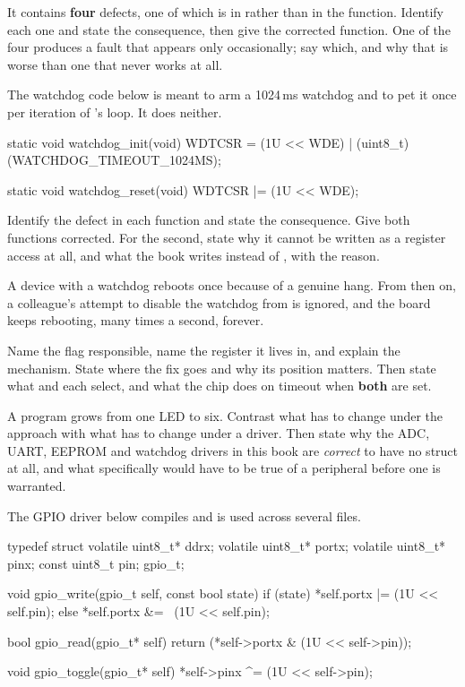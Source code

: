 \noindent It contains \textbf{four} defects, one of which is in  rather than in the
function. Identify each one and state the consequence, then give the corrected function. One of the
four produces a fault that appears only occasionally; say which, and why that is worse than one
that never works at all. 

 The watchdog code below is meant to arm a 1024\,ms watchdog and to pet it once per
iteration of 's loop. It does neither.

\begin{ccode}
static void watchdog_init(void)
{
    WDTCSR = (1U << WDE) | (uint8_t)(WATCHDOG_TIMEOUT_1024MS);
}

static void watchdog_reset(void)
{
    WDTCSR |= (1U << WDE);
}
\end{ccode}

\noindent Identify the defect in each function and state the consequence. Give both functions
corrected. For the second, state why it cannot be written as a register access at all, and what
the book writes instead of , with the reason. 

 A device with a watchdog reboots once because of a genuine hang. From then on, a
colleague's attempt to disable the watchdog from  is ignored, and the board keeps
rebooting, many times a second, forever.

Name the flag responsible, name the register it lives in, and explain the mechanism. State where
the fix goes and why its position matters. Then state what  and  each select,
and what the chip does on timeout when \textbf{both} are set. 

\label{exa:q:7}

 A program grows from one LED to six. Contrast what has to change under the
 approach with what has to change under a
 driver. Then state why the ADC, UART, EEPROM and watchdog drivers in this book are
\emph{correct} to have no struct at all, and what specifically would have to be true of a
peripheral before one is warranted. 

 The GPIO driver below compiles and is used across several files.

\begin{ccode}
typedef struct
{
    volatile uint8_t* ddrx;
    volatile uint8_t* portx;
    volatile uint8_t* pinx;
    const uint8_t pin;
} gpio_t;

void gpio_write(gpio_t self, const bool state)
{
    if (state) { *self.portx |= (1U << self.pin); }
    else { *self.portx &= ~(1U << self.pin); }
}

bool gpio_read(gpio_t* self)
{
    return (*self->portx & (1U << self->pin));
}

void gpio_toggle(gpio_t* self)
{
    *self->pinx ^= (1U << self->pin);
}
\end{ccode}

